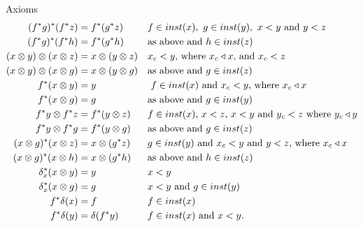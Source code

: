 \begin{frame}{Axioms}
\small \begin{align*}
(f^*g)^*(f^*z) &= f^*(g^*z)        && \mbox{$f \in inst(x),\ g \in inst(y),\ x < y$ and  $y < z$} \\
(f^*g)^*(f^*h) &= f^*(g^*h)        && \mbox{as above and $h \in inst(z)$ }\\
(x \cross y) \cross (x \cross z) &= x \cross (y \cross z)
                                   && \mbox{$x_c < y$, where $x_c \base x$, and $x_c < z$} \\
(x \cross y) \cross (x \cross g) &= x \cross (y \cross g)
                                   && \mbox{as above and $g \in inst(z)$}\\
f^*(x \cross y) &= y               && \mbox{ $f \in inst(x)$ and $x_c < y$, where $x_c \base x$}\\
f^*(x \cross g) &= g               && \mbox{as above and $g \in inst(y)$}\\
f^*y \cross f^*z &= f^*(y \cross z)  %
                    && \mbox{$f \in inst(x)$, $x < z$, $x < y$ and $y_c <z$ where $y_c \base y$}\\
f^*y \cross f^*g &= f^*(y \cross g)    && \mbox{as above  and $g \in inst(z)$}\\
(x \cross g)^*(x \cross z)&=x \cross(g^*z) && \mbox{$g \in inst(y)$ and $x_c < y$ and $y < z$, where $x_c \base x$}\\
(x \cross g)^*(x \cross h)&=x \cross(g^*h) && \mbox{as above and  $h \in inst(z)$}\\
\delta_x ^*(x \cross y)&=y                 && \mbox{$x < y$}\\
\delta_x ^*(x \cross g)&=g                 && \mbox{$x < y$ and $g\in inst(y)$}\\
f \sub \diag(x) &= f                       && \mbox{$f \in inst(x)$}\\
f \sub \diag(y) &= \diag(f \sub y)         && \mbox{$f \in inst(x)$ and  $x < y$.}
\end{align*}
\end{frame}